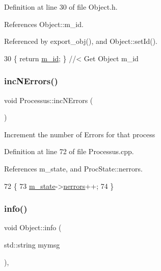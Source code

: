 Definition at line 30 of file Object.\+h.



References Object\+::m\+\_\+id.



Referenced by export\+\_\+obj(), and Object\+::set\+Id().


\begin{DoxyCode}
30 \{ \textcolor{keywordflow}{return} \hyperlink{classObject_aca74b9dbfed7b5556ea2d56c65b6b6b0}{m\_id};         \} \textcolor{comment}{//< Get Object m\_id }
\end{DoxyCode}
\mbox{\label{classProcessus_abe603d0636f76db6aa6c5c60cf34c591}} 
\subsubsection{\texorpdfstring{inc\+N\+Errors()}{incNErrors()}}
{\footnotesize\ttfamily void Processus\+::inc\+N\+Errors (\begin{DoxyParamCaption}{ }\end{DoxyParamCaption})}

Increment the number of Errors for that process 

Definition at line 72 of file Processus.\+cpp.



References m\+\_\+state, and Proc\+State\+::nerrors.


\begin{DoxyCode}
72                            \{
73   \hyperlink{classProcessus_ab3539eee42891ceae0baf4395ae7fb61}{m\_state}->\hyperlink{structProcState_a51a0f54ba62b07e07ac8518c5f32828d}{nerrors}++;
74 \}
\end{DoxyCode}
\mbox{\label{classObject_a644fd329ea4cb85f54fa6846484b84a8}} 
\subsubsection{\texorpdfstring{info()}{info()}\hspace{0.1cm}{\footnotesize\ttfamily [1/2]}}
{\footnotesize\ttfamily void Object\+::info (\begin{DoxyParamCaption}\item[{std\+::string}]{mymsg }\end{DoxyParamCaption})\hspace{0.3cm}{\ttfamily [inline]}, {\ttfamily [inherited]}}



